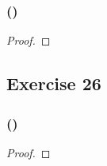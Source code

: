\documentclass[14pt]{extarticle}
\begin{document}
\subsubsection{()}

\begin{proof}

\end{proof}

\subsection{Exercise 26}

\subsubsection{()}

\begin{proof}

\end{proof}
\end{document}
